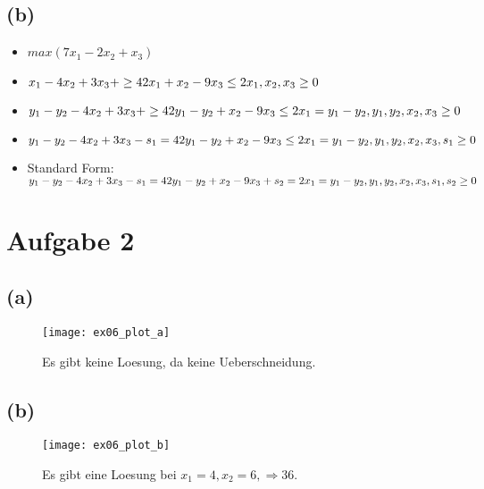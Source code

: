\documentclass[a4paper]{scrartcl}
\begin{document}
\subsection*{(b)}
\begin{itemize}
\item $max(7x_1 - 2x_2 + x_3)$
\item
$
x_1 - 4x_2 + 3x_3 + \geq 42\\
x_1 + x_2 - 9x_3 \leq 2\\
x_1, x_2, x_3 \geq 0
$
\\
\item
$
y_1 - y_2 - 4x_2 + 3x_3 + \geq 42\\
y_1 - y_2 + x_2 - 9x_3 \leq 2\\
x_1 = y_1 - y_2, y_1, y_2, x_2, x_3 \geq 0
$
\\
\item
$
y_1 - y_2 - 4x_2 + 3x_3 - s_1 = 42\\
y_1 - y_2 + x_2 - 9x_3 \leq 2\\
x_1 = y_1 - y_2, y_1, y_2, x_2, x_3, s_1 \geq 0
$
\\
\item
Standard Form:\\
$
y_1 - y_2 - 4x_2 + 3x_3 - s_1 = 42\\
y_1 - y_2 + x_2 - 9x_3 + s_2 = 2\\
x_1 = y_1 - y_2, y_1, y_2, x_2, x_3, s_1, s_2 \geq 0
$
\end{itemize}


\section*{Aufgabe 2}

\subsection*{(a)}
\begin{figure}[H]
	\texttt{[image: ex06\_plot\_a]}
	\caption{Es gibt keine Loesung, da keine Ueberschneidung.}
\end{figure}



\subsection*{(b)}
\begin{figure}[H]
	\texttt{[image: ex06\_plot\_b]}
	\caption{Es gibt eine Loesung bei $x_1 = 4, x_2 = 6, \Rightarrow 36$.}
\end{figure}
\end{document}
